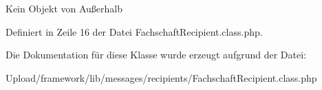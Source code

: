 Kein Objekt von Außerhalb 

Definiert in Zeile 16 der Datei Fachschaft\+Recipient.\+class.\+php.



Die Dokumentation für diese Klasse wurde erzeugt aufgrund der Datei\+:\begin{DoxyCompactItemize}
\item 
Upload/framework/lib/messages/recipients/Fachschaft\+Recipient.\+class.\+php\end{DoxyCompactItemize}
